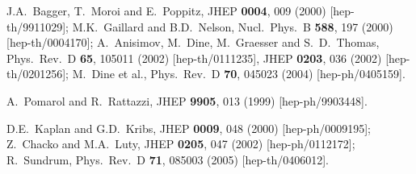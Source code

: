 \documentclass[12pt]{article}
\begin{document}
\begin{thebibliography}{999}
J.A.~Bagger, T.~Moroi and E.~Poppitz,
  JHEP {\bf 0004}, 009 (2000)
  [hep-th/9911029];
M.K.~Gaillard and B.D.~Nelson,
  Nucl.\ Phys.\ B {\bf 588}, 197 (2000)
  [hep-th/0004170];
A.~Anisimov, M.~Dine, M.~Graesser and S.~D.~Thomas,
  Phys.\ Rev.\ D {\bf 65}, 105011 (2002)
  [hep-th/0111235],
  JHEP {\bf 0203}, 036 (2002)
  [hep-th/0201256];
M.~Dine et al.,
  Phys.\ Rev.\ D {\bf 70}, 045023 (2004)
  [hep-ph/0405159].

A.~Pomarol and R.~Rattazzi,
  JHEP {\bf 9905}, 013 (1999)
  [hep-ph/9903448].

D.E.~Kaplan and G.D.~Kribs,
  JHEP {\bf 0009}, 048 (2000)
  [hep-ph/0009195];
Z.~Chacko and M.A.~Luty,
  JHEP {\bf 0205}, 047 (2002)
  [hep-ph/0112172];
R.~Sundrum,
  Phys.\ Rev.\ D {\bf 71}, 085003 (2005)
  [hep-th/0406012].


\end{thebibliography}
\end{document}
